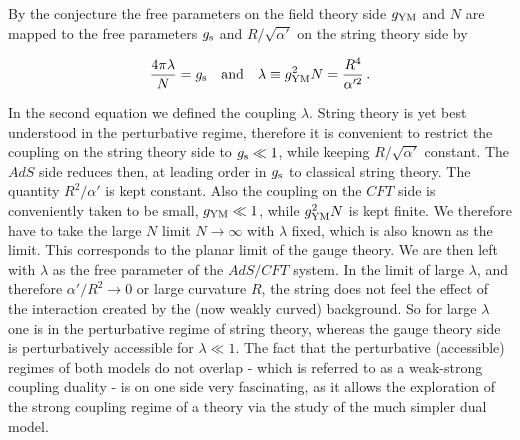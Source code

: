 %
%
\noindent By the conjecture the free parameters on the field theory side $g_{\rm YM}$ and $N$ are mapped to the free parameters $g_{\rm s}$ and $R/\sqrt{\alpha'}$ on the string theory side by
%
%
\begin{tcolorbox}[colback=white!95!black, colframe=white!90!black]
\begin{equation}
\frac{4\pi \lambda}{N} =  g_{\rm s} \quad {\rm and} \quad \lambda \equiv g_{\rm YM}^{2}N = \frac{R^{4}}{\alpha'^{2}}\,.
\end{equation}
\end{tcolorbox}
%
%
In the second equation we defined the  coupling $\lambda$. String theory is yet best understood in the perturbative regime, therefore it is convenient to restrict the coupling on the string theory side to $g_{\rm s}\ll 1$, while keeping $R/\sqrt{\alpha'}$ constant. The $AdS$ side reduces then, at leading order in $g_{\rm s}$ to classical string theory. The quantity $R^{2}/\alpha'$ is kept constant.  Also the coupling on the $CFT$ side is conveniently taken to be small, $g_{\rm YM} \ll 1$, while $g_{\rm YM}^{2}N$ is kept finite. We therefore have to take the large $N$ limit $N \to \infty$ with $\lambda$ fixed, which is also known as the  limit. This corresponds to the planar limit of the gauge theory. We are then left with $\lambda$ as the free parameter of the $AdS/CFT$ system. In the limit of large $\lambda$, and therefore $\alpha'/R^{2}\to 0$ or large curvature $R$, the string does not feel the effect of the interaction created by the (now weakly curved) background. So for large $\lambda$ one is in the perturbative regime of string theory, whereas the gauge theory side is perturbatively accessible for $\lambda \ll 1$.
%
%
The fact that the perturbative (accessible) regimes of both models do not overlap - which is referred to as a weak-strong coupling duality - is on one side very fascinating, as it allows the exploration of the strong coupling regime of a theory via the study of the much simpler dual model.
